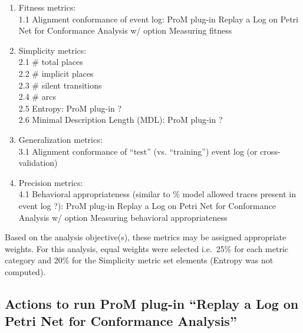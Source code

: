 \documentclass[]{article}
\begin{document}
\begin{enumerate}
\def\labelenumi{\arabic{enumi}.}
\item
  Fitness metrics:\\1.1 Alignment conformance of event log: ProM plug-in
  Replay a Log on Petri Net for Conformance Analysis w/ option Measuring
  fitness
\item
  Simplicity metrics:\\2.1 \# total places\\2.2 \# implicit places\\2.3
  \# silent transitions\\2.4 \# arcs\\2.5 Entropy: ProM plug-in ?\\2.6
  Minimal Description Length (MDL): ProM plug-in ?
\item
  Generalization metrics:\\3.1 Alignment conformance of ``test'' (vs.
  ``training'') event log (or cross-validation)
\item
  Precision metrics:\\4.1 Behavioral appropriateness (similar to \%
  model allowed traces present in event log ?): ProM plug-in Replay a
  Log on Petri Net for Conformance Analysis w/ option Measuring
  behavioral appropriateness
\end{enumerate}

Based on the analysis objective(s), these metrics may be assigned
appropriate weights. For this analysis, equal weights were selected
i.e.~25\% for each metric category and 20\% for the Simplicity metric
set elements (Entropy was not computed).

\subsection{Actions to run ProM plug-in ``Replay a Log on Petri Net for
Conformance
Analysis''}\label{actions-to-run-prom-plug-in-replay-a-log-on-petri-net-for-conformance-analysis}
\end{document}
